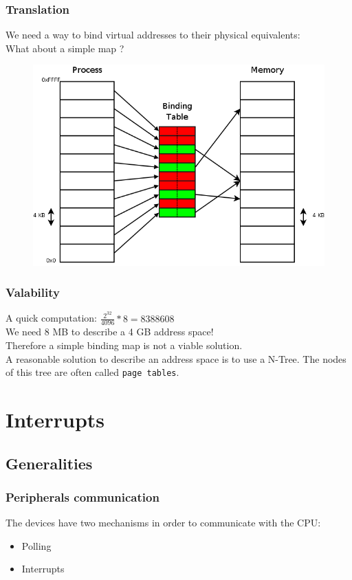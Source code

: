 \documentclass{beamer}
\begin{document}
\begin{frame}
  \frametitle{Translation}

  We need a way to bind virtual addresses to their physical equivalents:\\
  What about a simple map ?

  \begin{figure}
  \includegraphics[scale=0.25]{bind.png}
  \end{figure}
\end{frame}

\begin{frame}
  \frametitle{Valability}

  A quick computation: $\frac{2^{32}}{4096} * 8 = 8388608$\\
  We need 8 MB to describe a 4 GB address space!\\
  Therefore a simple binding map is not a viable solution.\\
  \vspace{10pt}
  A reasonable solution to describe an address space is to use a N-Tree. The nodes of this tree are often called \texttt{page tables}.
\end{frame}

\section{Interrupts}

\subsection{Generalities}

\begin{frame}
  \frametitle{Peripherals communication}

  The devices have two mechanisms in order to communicate with the CPU:\\
  \begin{itemize}
  \item
    Polling
  \item
    Interrupts
  \end{itemize}
\end{frame}
\end{document}
